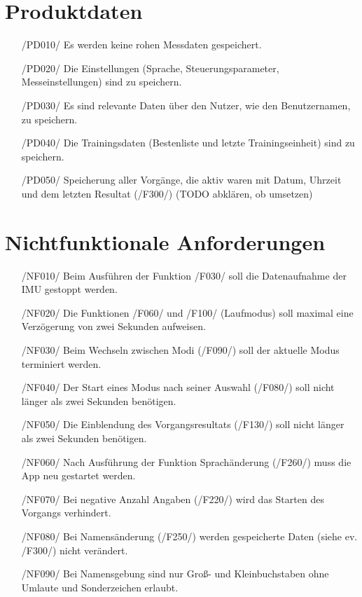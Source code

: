 \documentclass[a4paper,12pt]{article}
\begin{document}
\section{Produktdaten}
\begin{itemize}
	\item[/PD010/] Es werden keine rohen Messdaten gespeichert.
	\item[/PD020/] Die Einstellungen (Sprache, Steuerungsparameter, Messeinstellungen) sind zu speichern. 
	\item[/PD030/] Es sind relevante Daten über den Nutzer, wie den Benutzernamen, zu speichern.
	\item[/PD040/] Die Trainingsdaten (Bestenliste und letzte Trainingseinheit) sind zu speichern. %
	\item[/PD050/] Speicherung aller Vorgänge, die aktiv waren mit Datum, Uhrzeit und dem letzten Resultat (/F300/) (TODO abklären, ob umsetzen)
\end{itemize}


\section{Nichtfunktionale Anforderungen}

\begin{itemize}
  \item[/NF010/] Beim Ausführen der Funktion /F030/ soll die Datenaufnahme der IMU gestoppt werden.
  \item[/NF020/] Die Funktionen /F060/ und /F100/ (Laufmodus) soll maximal eine Verzögerung von zwei Sekunden aufweisen. %
  \item[/NF030/] Beim Wechseln zwischen Modi (/F090/) soll der aktuelle Modus terminiert werden.
  \item[/NF040/] Der Start eines Modus nach seiner Auswahl (/F080/) soll nicht länger als zwei Sekunden benötigen.
  \item[/NF050/] Die Einblendung des Vorgangsresultats (/F130/) soll nicht länger als zwei Sekunden benötigen.
  \item[/NF060/] Nach Ausführung der Funktion  Sprachänderung (/F260/) muss die App neu gestartet werden.
  \item[/NF070/] Bei negative Anzahl Angaben (/F220/) wird das Starten des Vorgangs verhindert.
  \item[/NF080/] Bei Namensänderung (/F250/) werden gespeicherte Daten (siehe ev. /F300/) nicht verändert.
  \item[/NF090/] Bei Namensgebung sind nur Groß- und Kleinbuchstaben ohne Umlaute und Sonderzeichen erlaubt.
\end{itemize}
\end{document}
